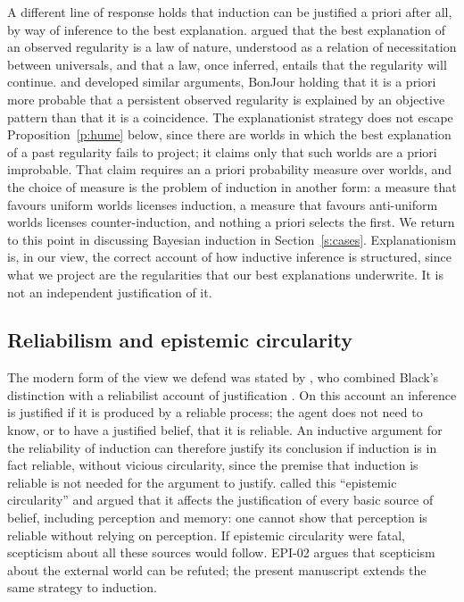 \documentclass{situationist-preprint}
\begin{document}
A different line of response holds that induction can be justified a priori after all, by way of inference to the best explanation. \citet{Armstrong1983} argued that the best explanation of an observed regularity is a law of nature, understood as a relation of necessitation between universals, and that a law, once inferred, entails that the regularity will continue. \citet{Foster1983} and \citet{BonJour1998} developed similar arguments, BonJour holding that it is a priori more probable that a persistent observed regularity is explained by an objective pattern than that it is a coincidence. The explanationist strategy does not escape Proposition~\ref{p:hume} below, since there are worlds in which the best explanation of a past regularity fails to project; it claims only that such worlds are a priori improbable. That claim requires an a priori probability measure over worlds, and the choice of measure is the problem of induction in another form: a measure that favours uniform worlds licenses induction, a measure that favours anti-uniform worlds licenses counter-induction, and nothing a priori selects the first. We return to this point in discussing Bayesian induction in Section~\ref{s:cases}. Explanationism is, in our view, the correct account of how inductive inference is structured, since what we project are the regularities that our best explanations underwrite. It is not an independent justification of it.

\subsection{Reliabilism and epistemic circularity}

The modern form of the view we defend was stated by \citet{vanCleve1984}, who combined Black's distinction with a reliabilist account of justification \citep{Goldman1979}. On this account an inference is justified if it is produced by a reliable process; the agent does not need to know, or to have a justified belief, that it is reliable. An inductive argument for the reliability of induction can therefore justify its conclusion if induction is in fact reliable, without vicious circularity, since the premise that induction is reliable is not needed for the argument to justify. \citet{Alston1986} called this \enquote{epistemic circularity} and argued that it affects the justification of every basic source of belief, including perception and memory: one cannot show that perception is reliable without relying on perception. If epistemic circularity were fatal, scepticism about all these sources would follow. EPI-02 argues that scepticism about the external world can be refuted; the present manuscript extends the same strategy to induction.
\end{document}
